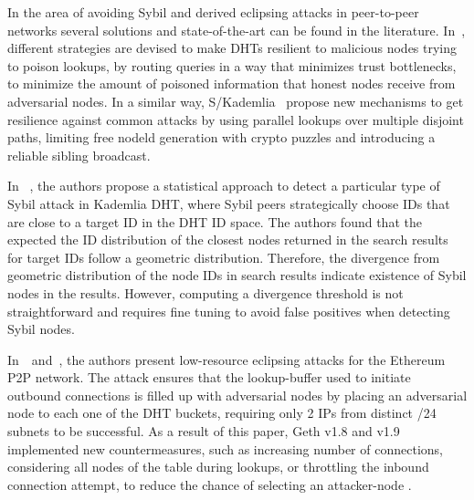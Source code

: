 






In the area of avoiding Sybil and derived eclipsing attacks in peer-to-peer networks several solutions and state-of-the-art can be found in the literature.
In~\cite{danezis2005sybil}, different strategies are devised to make DHTs resilient to malicious nodes trying to poison lookups, by routing queries in a way that minimizes trust bottlenecks, to minimize the amount of poisoned information that honest nodes receive from adversarial nodes.
In a similar way, S/Kademlia~\cite{skad} propose new mechanisms to get resilience against common attacks by using parallel lookups over multiple disjoint paths, limiting free nodeld generation with crypto puzzles and introducing a reliable sibling broadcast.

In ~\cite{cholez2010efficient}, the authors propose a statistical approach to detect a particular type of Sybil attack in  Kademlia DHT, where Sybil peers strategically choose IDs that are close to a target ID in the DHT ID space.
The authors found that the expected the ID distribution of the closest nodes returned in the search results for target IDs follow a geometric distribution. Therefore, the divergence from geometric distribution of the node IDs in search results indicate existence of Sybil nodes in the results. However, computing a divergence threshold is not straightforward and requires fine tuning to avoid false positives when detecting Sybil nodes.

In~\cite{marcus2018low}~and~\cite{henningsen2019eclipsing}, the authors present low-resource eclipsing attacks for the Ethereum P2P network. 
The attack ensures that the lookup-buffer used to initiate outbound connections is filled up with adversarial nodes by placing an adversarial node to each one of the DHT buckets, requiring only 2 IPs from distinct /24 subnets to be successful.
As a result of this paper, Geth v1.8 and v1.9 implemented new countermeasures, such as  increasing number of connections, considering all nodes of the table during lookups, or throttling the inbound connection attempt, to reduce the chance of selecting an attacker-node .

